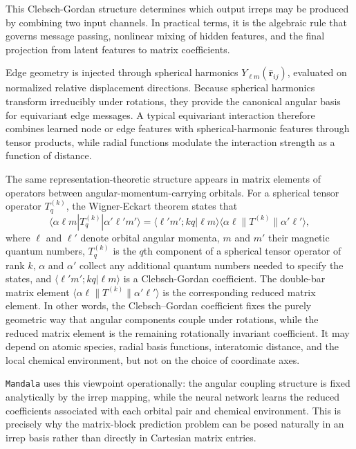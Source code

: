 \documentclass[preprint,12pt,compress,numafflabel]{elsarticle}
\begin{document}
This Clebsch-Gordan structure determines which output irreps may be produced by combining two input channels.
In practical terms, it is the algebraic rule that governs message passing, nonlinear mixing of hidden features, and the final projection from latent features to matrix coefficients.

Edge geometry is injected through spherical harmonics $Y_{\ell m}(\hat{\bm{r}}_{ij})$, evaluated on normalized relative displacement
directions.
Because spherical harmonics transform irreducibly under rotations, they provide the canonical angular basis for equivariant edge messages.
A typical equivariant interaction therefore combines learned node or edge features with spherical-harmonic features through tensor products, while radial functions modulate the interaction strength as a function of distance.

The same representation-theoretic structure appears in matrix elements of operators between angular-momentum-carrying orbitals. For a spherical tensor operator $T^{(k)}_q$, the Wigner-Eckart theorem states that
\begin{equation}
\langle \alpha \ell m | T^{(k)}_q | \alpha' \ell' m' \rangle
=
\langle \ell' m'; k q | \ell m \rangle
\langle \alpha \ell \| T^{(k)} \| \alpha' \ell' \rangle,
\end{equation}
where $\ell$ and $\ell'$ denote orbital angular momenta, $m$ and $m'$ their magnetic quantum numbers, $T^{(k)}_q$ is the $q$th component of a spherical tensor operator of rank $k$, $\alpha$ and $\alpha'$ collect any additional quantum numbers needed to specify the states, and $\langle \ell' m'; k q | \ell m \rangle$ is a Clebsch-Gordan coefficient.
The double-bar matrix element $\langle \alpha \ell \| T^{(k)} \| \alpha' \ell' \rangle$ is the corresponding reduced matrix element.
In other words, the Clebsch--Gordan coefficient fixes the purely geometric way that angular components couple under rotations, while the reduced matrix element is the remaining rotationally invariant coefficient.
It may depend on atomic species, radial basis functions, interatomic distance, and the local chemical environment, but not on the choice of coordinate axes.

\texttt{Mandala} uses this viewpoint operationally: the angular coupling structure is fixed analytically by the irrep mapping, while the neural network learns the reduced coefficients associated with each orbital pair and chemical environment.
This is precisely why the matrix-block prediction problem can be posed naturally in an irrep basis rather than directly in Cartesian matrix entries.
\end{document}
